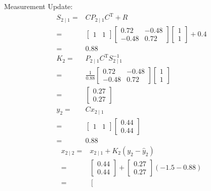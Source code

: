 \documentclass[twoside]{article}
\renewcommand{\t}{^\mathrm{T}{}}
\begin{document}
\begin{itemize}
	Measurement Update:
\begin{align*}
	S_{2\mid 1} =& C P_{2\mid1}C\t+R\\
	=& \left[\begin{array}{cc}
		1 & 1
	\end{array} \right] \left[ \begin{array}{cc}
		0.72 & -0.48 \\ -0.48 & 0.72
	\end{array}\right]\left[ \begin{array}{c}
		1 \\ 1
	\end{array}\right] + 0.4\\
	=& 0.88\\
	K_2 =& P_{2\mid1}C\t S^{-1}_{2\mid1}\\
	=&\frac{1}{0.88}\left[ \begin{array}{cc}
		0.72 & -0.48 \\ -0.48 & 0.72
	\end{array}\right]\left[ \begin{array}{c}
		1 \\ 1
	\end{array}\right]\\
	=& \left[ \begin{array}{c}
		0.27 \\ 0.27
	\end{array}\right]\\
	\hat y_2 =& C x_{2\mid1}\\
	=& \left[\begin{array}{cc}
		1 & 1
	\end{array} \right] \left[ \begin{array}{c}
		0.44 \\ 0.44
	\end{array}\right] \\
	=& 0.88
\end{align*}
\begin{align*}
	x_{2\mid2} =& x_{2\mid1}+K_2(y_2-\hat y_2)\\
	=& \left[ \begin{array}{c}
		0.44 \\ 0.44
	\end{array}\right] + \left[ \begin{array}{c}
		0.27 \\ 0.27
	\end{array}\right] (-1.5-0.88)\\
	=&\left[ \begin{array}{c}

\end{array}
\end{align*}
\end{itemize}
\end{document}
